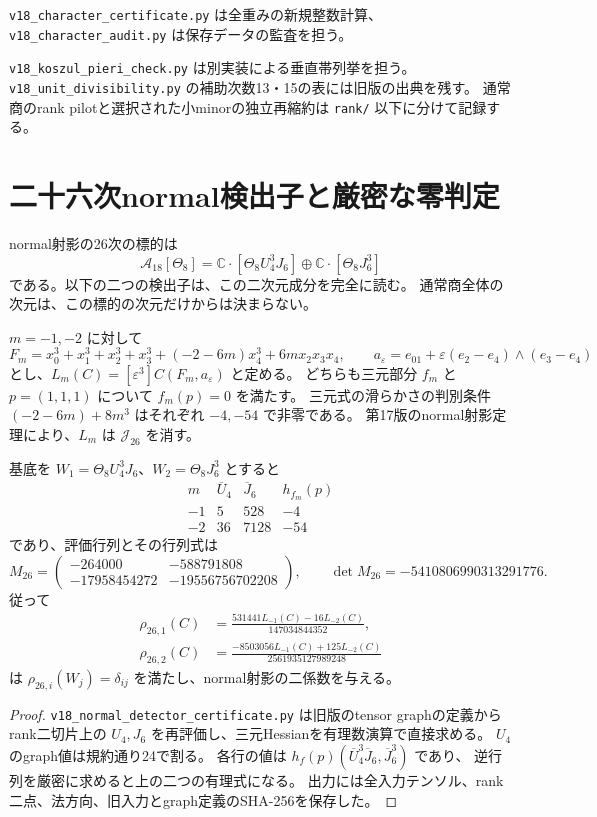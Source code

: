 \nolinkurl{v18_character_certificate.py} は全重みの新規整数計算、
\nolinkurl{v18_character_audit.py} は保存データの監査を担う。

\nolinkurl{v18_koszul_pieri_check.py} は別実装による垂直帯列挙を担う。
\nolinkurl{v18_unit_divisibility.py} の補助次数13・15の表には旧版の出典を残す。
通常商のrank pilotと選択された小minorの独立再縮約は
\texttt{rank/} 以下に分けて記録する。



\section{二十六次normal検出子と厳密な零判定}
\label{sec:v18-normal26-detectors}

normal射影の26次の標的は
\[
 \mathcal A_{18}[\Theta_8]
 =\mathbb C\cdot[\Theta_8U_4^3J_6]\oplus\mathbb C\cdot[\Theta_8J_6^3]
\]
である。以下の二つの検出子は、この二次元成分を完全に読む。
通常商全体の次元は、この標的の次元だけからは決まらない。

$m=-1,-2$ に対して
\[
 F_m=x_0^3+x_1^3+x_2^3+x_3^3+(-2-6m)x_4^3+6mx_2x_3x_4,
 \qquad a_\varepsilon=e_{01}+\varepsilon(e_2-e_4)\wedge(e_3-e_4)
\]
とし、$L_m(C)=[\varepsilon^3]C(F_m,a_\varepsilon)$ と定める。
どちらも三元部分 $f_m$ と $p=(1,1,1)$ について $f_m(p)=0$ を満たす。
三元式の滑らかさの判別条件 $(-2-6m)+8m^3$ はそれぞれ $-4,-54$ で非零である。
第17版のnormal射影定理により、$L_m$ は $\mathcal J_{26}$ を消す。

\begin{proposition}[二つの有理normal検出子]\label{prop:v18-normal-jet-detectors}
基底を $W_1=\Theta_8U_4^3J_6$、$W_2=\Theta_8J_6^3$ とすると
\[
 \begin{array}{c|rrr}
 m&\overline U_4&\overline J_6&h_{f_m}(p)\\\hline
 -1&5&528&-4\\
 -2&36&7128&-54
 \end{array}
\]
であり、評価行列とその行列式は
\[
 M_{26}=
 \begin{pmatrix}
 -264000&-588791808\\
 -17958454272&-19556756702208
 \end{pmatrix},\qquad
 \det M_{26}=-5410806990313291776.
\]
従って
\begin{align*}
 \rho_{26,1}(C)&=
 \frac{531441L_{-1}(C)-16L_{-2}(C)}{147034844352},\\
 \rho_{26,2}(C)&=
 \frac{-8503056L_{-1}(C)+125L_{-2}(C)}{2561935127989248}
\end{align*}
は $\rho_{26,i}(W_j)=\delta_{ij}$ を満たし、normal射影の二係数を与える。
\end{proposition}
\begin{proof}
\texttt{v18\_normal\_detector\_certificate.py} は旧版のtensor graphの定義から
rank二切片上の $U_4,J_6$ を再評価し、三元Hessianを有理数演算で直接求める。
$U_4$ のgraph値は規約通り24で割る。
各行の値は $h_f(p)(\overline U_4^3\overline J_6,\overline J_6^3)$ であり、
逆行列を厳密に求めると上の二つの有理式になる。
出力には全入力テンソル、rank二点、法方向、旧入力とgraph定義のSHA-256を保存した。
\end{proof}

